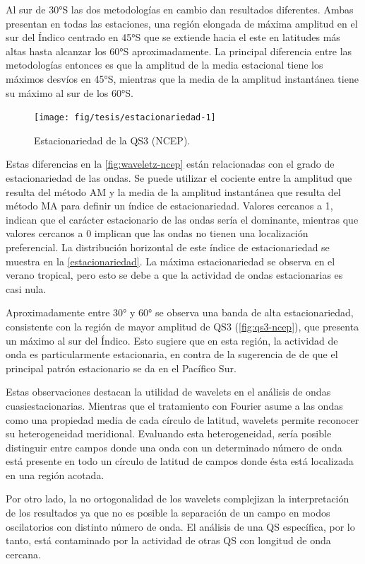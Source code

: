 \documentclass[spanish,a4paper,12pt,oneside]{book}
\begin{document}
Al sur de 30°S las dos metodologías en cambio dan resultados diferentes.
Ambas presentan en todas las estaciones, una región elongada de máxima
amplitud en el sur del Índico centrado en 45°S que se extiende hacia el
este en latitudes más altas hasta alcanzar los 60°S aproximadamente. La
principal diferencia entre las metodologías entonces es que la amplitud
de la media estacional tiene los máximos desvíos en 45°S, mientras que
la media de la amplitud instantánea tiene su máximo al sur de los 60°S.

\begin{figure}
\texttt{[image: fig/tesis/estacionariedad-1]} \caption{Estacionariedad de la QS3 (NCEP).}\label{fig:estacionariedad}
\end{figure}

Estas diferencias en la \autoref{fig:waveletz-ncep} están relacionadas
con el grado de estacionariedad de las ondas. Se puede utilizar el
cociente entre la amplitud que resulta del método AM y la media de la
amplitud instantánea que resulta del método MA para definir un índice de
estacionariedad. Valores cercanos a 1, indican que el carácter
estacionario de las ondas sería el dominante, mientras que valores
cercanos a 0 implican que las ondas no tienen una localización
preferencial. La distribución horizontal de este índice de
estacionariedad se muestra en la \autoref{estacionariedad}. La máxima
estacionariedad se observa en el verano tropical, pero esto se debe a
que la actividad de ondas estacionarias es casi nula.

Aproximadamente entre 30° y 60° se observa una banda de alta
estacionariedad, consistente con la región de mayor amplitud de QS3
(\autoref{fig:qs3-ncep}), que presenta un máximo al sur del Índico. Esto
sugiere que en esta región, la actividad de onda es particularmente
estacionaria, en contra de la sugerencia de \textcite{Hobbs2010} de que
el principal patrón estacionario se da en el Pacífico Sur.

Estas observaciones destacan la utilidad de wavelets en el análisis de
ondas cuasiestacionarias. Mientras que el tratamiento con Fourier asume
a las ondas como una propiedad media de cada círculo de latitud,
wavelets permite reconocer su heterogeneidad meridional. Evaluando esta
heterogeneidad, sería posible distinguir entre campos donde una onda con
un determinado número de onda está presente en todo un círculo de
latitud de campos donde ésta está localizada en una región acotada.

Por otro lado, la no ortogonalidad de los wavelets complejizan la
interpretación de los resultados ya que no es posible la separación de
un campo en modos oscilatorios con distinto número de onda. El análisis
de una QS específica, por lo tanto, está contaminado por la actividad de
otras QS con longitud de onda cercana.
\end{document}
